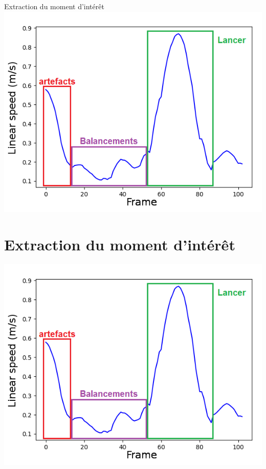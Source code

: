 \documentclass[svgnames]{beamer}
\begin{document}
	\begin{frame}{Extraction du moment d'intérêt}
	\centering
		\includegraphics[scale=0.4]{img/after_savgol_explained.png}
	\end{frame}
	
	\section{Extraction du moment d'intérêt}
	\begin{frame}{\secname}
	\centering
		\includegraphics[scale=0.4]{img/after_savgol_explained.png}
	\end{frame}
	
\end{document}
